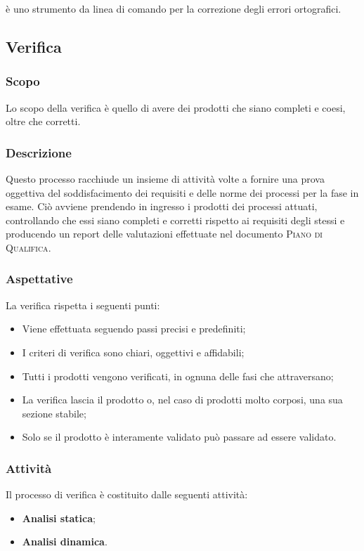  è uno strumento da linea di comando per la correzione degli errori ortografici. 

\subsection{Verifica}

\subsubsection{Scopo}
Lo scopo della verifica è quello di avere dei prodotti che siano completi e coesi, oltre che corretti.

\subsubsection{Descrizione}
Questo processo racchiude un insieme di attività volte a fornire una prova oggettiva del soddisfacimento dei requisiti e delle norme dei 
processi per la fase in esame. Ciò avviene prendendo in ingresso i prodotti dei processi attuati, controllando che essi siano completi e corretti 
rispetto ai requisiti degli stessi e producendo un report delle valutazioni effettuate nel documento \textsc{Piano di Qualifica}.

\subsubsection{Aspettative}
La verifica rispetta i seguenti punti:
\begin{itemize}
    \item Viene effettuata seguendo passi precisi e predefiniti;
    \item I criteri di verifica sono chiari, oggettivi e affidabili;
    \item Tutti i prodotti vengono verificati, in ognuna delle fasi che attraversano;
    \item La verifica lascia il prodotto o, nel caso di prodotti molto corposi, una sua sezione stabile;
    \item Solo se il prodotto è interamente validato può passare ad essere validato.
\end{itemize}

\subsubsection{Attività}
\label{sub:verifica:attivita}

Il processo di verifica è costituito dalle seguenti attività:
\begin{itemize}
	\item \textbf{Analisi statica};
	\item \textbf{Analisi dinamica}.
\end{itemize}

